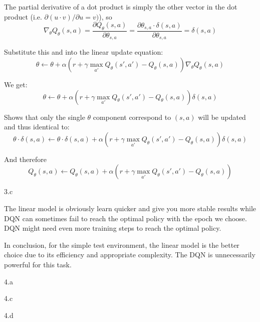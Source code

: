 \begin{answer}
  The partial derivative of a dot product is simply the other vector in the dot product (i.e. $\partial (u \cdot v) / \partial u = v)$), so
  $$
  \nabla_{\theta}Q_{\theta}(s,a) = \frac{\partial Q_{\theta}(s,a)}{\partial \theta_{s,a}} = \frac{\partial \theta_{s,a} \cdot \delta(s,a)}{\partial \theta_{s,a}} = \delta(s,a)
  $$

  Substitute this and into the linear update equation:
  $$
  \theta \leftarrow \theta + \alpha(r + \gamma \max_{a'}Q_{\theta}(s',a') - Q_{\theta}(s,a))\nabla_{\theta}Q_{\theta}(s,a)
  $$

  We get:
  $$
  \theta \leftarrow \theta + \alpha(r + \gamma \max_{a'}Q_{\theta}(s',a') - Q_{\theta}(s,a))\delta(s,a)
  $$

  Shows that only the single $\theta$ component correspond to $(s,a)$ will be updated and thus identical to:
  $$
  \theta \cdot \delta(s,a) \leftarrow \theta \cdot \delta(s,a) + \alpha(r + \gamma \max_{a'}Q_{\theta}(s',a') - Q_{\theta}(s,a))\delta(s,a)
  $$

  And therefore
  $$
  Q_{\theta}(s,a) \leftarrow Q_{\theta}(s,a) + \alpha(r + \gamma \max_{a'}Q_{\theta}(s',a') - Q_{\theta}(s,a))
  $$
\end{answer}
\clearpage


\LARGE
3.c
\normalsize

\begin{answer}
  The linear model is obviously learn quicker and give you more stable results while DQN can sometimes fail to reach the optimal policy with the epoch we choose. DQN might need even more training steps to reach the optimal policy.

  In conclusion, for the simple test environment, the linear model is the better choice due to its efficiency and appropriate complexity. The DQN is unnecessarily powerful for this task.
\end{answer}
\clearpage

\LARGE
4.a
\normalsize

\begin{answer}
\end{answer}
\clearpage

\LARGE
4.c
\normalsize

\begin{answer}
\end{answer}
\clearpage

\LARGE
4.d
\normalsize

\begin{answer}
\end{answer}
\clearpage



